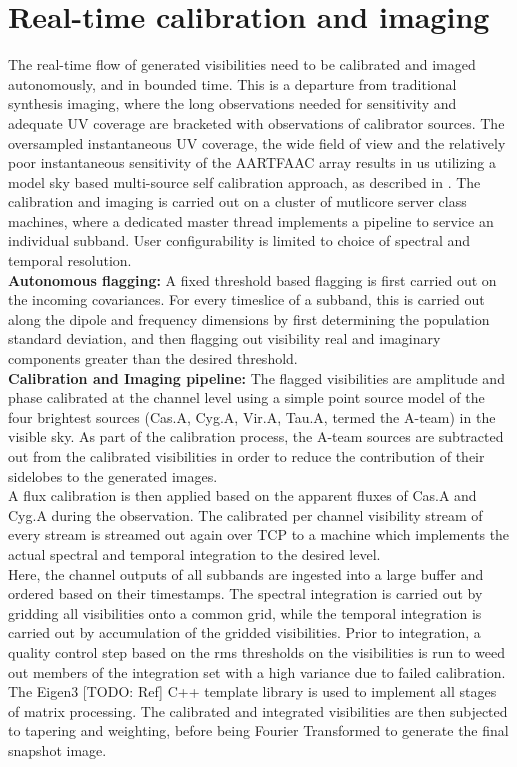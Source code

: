 \documentclass{ws-jai}
\begin{document}
\section {\label{sec:calim} Real-time calibration and imaging}
The real-time  flow of generated visibilities  need to be calibrated  and imaged
autonomously,  and  in bounded  time.   This  is  a departure  from  traditional
synthesis  imaging,  where the  long  observations  needed for  sensitivity  and
adequate UV coverage are bracketed  with observations of calibrator sources. The
oversampled instantaneous UV coverage, the wide field of view and the relatively
poor instantaneous sensitivity  of the AARTFAAC array results in  us utilizing a
model sky  based multi-source self  calibration approach, as described  in \cite
{prasad2014real}.  The  calibration and imaging is  carried out on a  cluster of
mutlicore server  class machines, where  a dedicated master thread  implements a
pipeline to service  an individual subband.  User configurability  is limited to
choice of spectral and temporal resolution.\\

\noindent \textbf {Autonomous flagging:} A fixed threshold based flagging is first carried
out  on the  incoming covariances.  For every  timeslice of  a subband,  this is
carried out along  the dipole and frequency dimensions by  first determining the
population  standard  deviation,  and  then flagging  out  visibility  real  and
imaginary components greater than the desired threshold.\\

\noindent \textbf  {Calibration  and  Imaging  pipeline:}  The  flagged  visibilities  are
amplitude and phase calibrated at the  channel level using a simple point source
model of  the four  brightest sources  (Cas.A, Cyg.A,  Vir.A, Tau.A,  termed the
A-team)  in the  visible sky.  As part  of the  calibration process,  the A-team
sources are subtracted  out from the calibrated visibilities in  order to reduce
the  contribution  of  their  sidelobes   to  the  generated  images.\\  A  flux
calibration is  then applied  based on  the apparent fluxes  of Cas.A  and Cyg.A
during the  observation. The calibrated  per channel visibility stream  of every
stream is streamed out  again over TCP to a machine  which implements the actual
spectral and temporal integration to the desired level.\\

Here, the channel outputs  of all subbands are ingested into  a large buffer and
ordered based on  their timestamps.  The spectral integration is  carried out by
gridding all visibilities onto a common  grid, while the temporal integration is
carried out by accumulation of the gridded visibilities. Prior to integration, a
quality control step based  on the rms thresholds on the  visibilities is run to
weed out  members of  the integration  set with  a high  variance due  to failed
calibration.  The Eigen3  [TODO: Ref] C++ template library is  used to implement
all stages of matrix processing.  The calibrated and integrated visibilities are
then subjected  to tapering and  weighting, before being Fourier  Transformed to
generate the final snapshot image.\\
\end{document}
